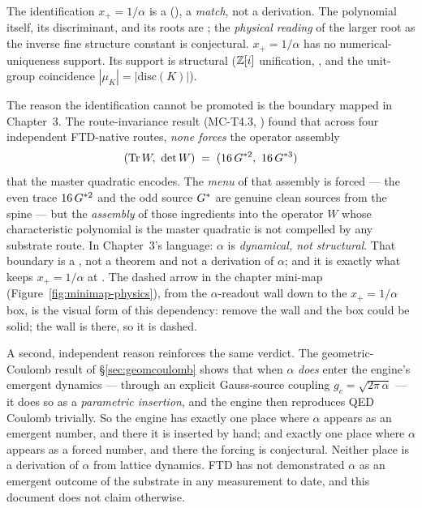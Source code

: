 \begin{conjecturebox}
The identification $x_+ = 1/\alpha$ is a  (), a
\emph{match}, not a derivation. The polynomial itself, its discriminant, and its
roots are ; the \emph{physical reading} of the larger root as the
inverse fine structure constant is conjectural.
$x_+ = 1/\alpha$ has no numerical-uniqueness support. Its support is structural ($\mathbb{Z}[i]$ unification, , and the
unit-group coincidence $|\mu_K| = |\mathrm{disc}(K)|$).
\end{conjecturebox}

The reason the identification cannot be promoted is the boundary mapped in
Chapter~3. The route-invariance result (MC-T4.3, ) found that across
four independent FTD-native routes, \emph{none forces} the operator assembly
\[
  (\operatorname{Tr} W,\ \det W) \;=\; (16\,G^{*2},\ 16\,G^{*3})
\]
that the master quadratic encodes. The \emph{menu} of that assembly is forced ---
the even trace $16\,G^{*2}$ and the odd source $G^{*}$ are genuine clean sources from
the spine --- but the \emph{assembly} of those ingredients into the operator $W$
whose characteristic polynomial is the master quadratic is not compelled by any
substrate route. In Chapter~3's language: $\alpha$ is \emph{dynamical, not
structural}. That boundary is a , not a theorem and not a
derivation of $\alpha$; and it is exactly what keeps $x_+ = 1/\alpha$ at .
The dashed arrow in the chapter mini-map (Figure~\ref{fig:minimap-physics}), from
the $\alpha$-readout wall down to the $x_+ = 1/\alpha$ box, is the visual form of
this dependency: remove the wall and the box could be solid; the wall is there, so
it is dashed.

A second, independent reason reinforces the same verdict. The geometric-Coulomb
result of \S\ref{sec:geomcoulomb} shows that when $\alpha$ \emph{does} enter the
engine's emergent dynamics --- through an explicit Gauss-source coupling
$g_c = \sqrt{2\pi\,\alpha}$ --- it does so as a \emph{parametric insertion}, and the
engine then reproduces QED Coulomb trivially. So the engine has exactly one place
where $\alpha$ appears as an emergent number, and there it is inserted by hand; and
exactly one place where $\alpha$ appears as a forced number, and there the forcing
is conjectural. Neither place is a derivation of $\alpha$ from lattice dynamics.
FTD has not demonstrated $\alpha$ as an emergent outcome of the substrate in any
measurement to date, and this document does not claim otherwise.

